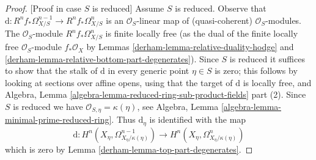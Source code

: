\begin{proof}
[Proof in case $S$ is reduced]
Assume $S$ is reduced. Observe that
$\text{d} : R^nf_*\Omega^{n - 1}_{X/S} \to R^nf_*\Omega^n_{X/S}$
is an $\mathcal{O}_S$-linear map of (quasi-coherent) $\mathcal{O}_S$-modules.
The $\mathcal{O}_S$-module $R^nf_*\Omega^n_{X/S}$ is finite locally free
(as the dual of the finite locally free $\mathcal{O}_S$-module
$f_*\mathcal{O}_X$ by Lemmas
\ref{derham-lemma-relative-duality-hodge} and
\ref{derham-lemma-relative-bottom-part-degenerates}).
Since $S$ is reduced it suffices to show that
the stalk of $\text{d}$ in every generic point $\eta \in S$
is zero; this follows by looking at sections over affine opens,
using that the target of $\text{d}$ is locally free, and
Algebra, Lemma \ref{algebra-lemma-reduced-ring-sub-product-fields} part (2).
Since $S$ is reduced we have $\mathcal{O}_{S, \eta} = \kappa(\eta)$, see
Algebra, Lemma \ref{algebra-lemma-minimal-prime-reduced-ring}.
Thus $\text{d}_\eta$ is identified with the map
$$
\text{d} :
H^n(X_\eta, \Omega^{n - 1}_{X_\eta/\kappa(\eta)})
\longrightarrow
H^n(X_\eta, \Omega^n_{X_\eta/\kappa(\eta)})
$$
which is zero by Lemma \ref{derham-lemma-top-part-degenerates}.
\end{proof}

